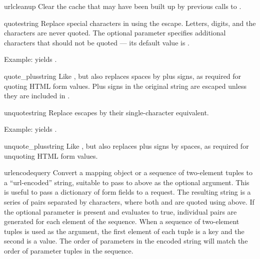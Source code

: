 \begin{funcdesc}{urlcleanup}{}
Clear the cache that may have been built up by previous calls to
.
\end{funcdesc}

\begin{funcdesc}{quote}{string}
Replace special characters in  using the  escape.
Letters, digits, and the characters  are never quoted.
The optional  parameter specifies additional characters
that should not be quoted --- its default value is .

Example:  yields .
\end{funcdesc}

\begin{funcdesc}{quote_plus}{string}
Like , but also replaces spaces by plus signs, as
required for quoting HTML form values.  Plus signs in the original
string are escaped unless they are included in .
\end{funcdesc}

\begin{funcdesc}{unquote}{string}
Replace  escapes by their single-character equivalent.

Example:  yields .
\end{funcdesc}

\begin{funcdesc}{unquote_plus}{string}
Like , but also replaces plus signs by spaces, as
required for unquoting HTML form values.
\end{funcdesc}

\begin{funcdesc}{urlencode}{query}
Convert a mapping object or a sequence of two-element tuples  to a
``url-encoded'' string, suitable to pass to 
 above as the optional  argument.  This
is useful to pass a dictionary of form fields to a 
request.  The resulting string is a series of
 pairs separated by \character{\&}
characters, where both  and  are quoted using
 above.  If the optional parameter  is
present and evaluates to true, individual  pairs
are generated for each element of the sequence.
When a sequence of two-element tuples is used as the  argument,
the first element of each tuple is a key and the second is a value.  The
order of parameters in the encoded string will match the order of parameter
tuples in the sequence.
\end{funcdesc}

